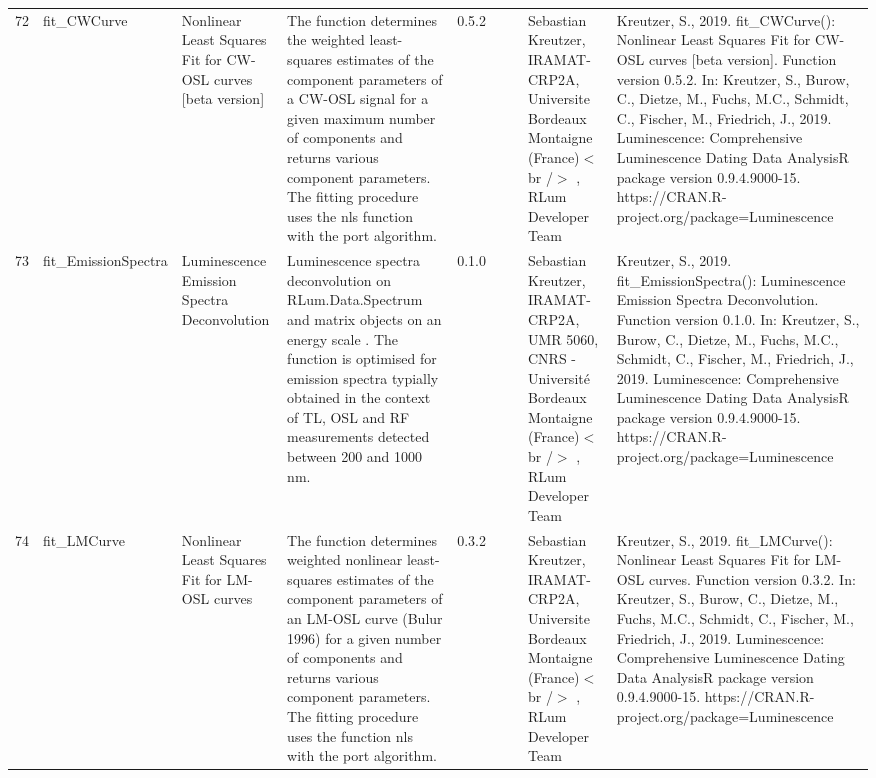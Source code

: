 \begin{table}[ht]
\begin{tabular}{rllllllll}
 \\ 
  72 & fit\_CWCurve & Nonlinear Least Squares Fit for CW-OSL curves  [beta version] & The function determines the weighted least-squares estimates of the component parameters of a CW-OSL signal for a given maximum number of components and returns various component parameters. The fitting procedure uses the  nls  function with the  port  algorithm. & 0.5.2
 &  &  & Sebastian Kreutzer, IRAMAT-CRP2A, Universite Bordeaux Montaigne (France)$<$br /$>$ , RLum Developer Team & Kreutzer, S., 2019. fit\_CWCurve(): Nonlinear Least Squares Fit for CW-OSL curves [beta version]. Function version 0.5.2. In: Kreutzer, S., Burow, C., Dietze, M., Fuchs, M.C., Schmidt, C., Fischer, M., Friedrich, J., 2019. Luminescence: Comprehensive Luminescence Dating Data AnalysisR package version 0.9.4.9000-15. https://CRAN.R-project.org/package=Luminescence
 \\ 
  73 & fit\_EmissionSpectra & Luminescence Emission Spectra Deconvolution & Luminescence spectra deconvolution on  RLum.Data.Spectrum  and  matrix  objects on an  energy scale . The function is optimised for emission spectra typially obtained in the context of TL, OSL and RF measurements detected between 200 and 1000 nm. & 0.1.0
 &  &  & Sebastian Kreutzer, IRAMAT-CRP2A, UMR 5060, CNRS - Université Bordeaux Montaigne (France)$<$br /$>$ , RLum Developer Team & Kreutzer, S., 2019. fit\_EmissionSpectra(): Luminescence Emission Spectra Deconvolution. Function version 0.1.0. In: Kreutzer, S., Burow, C., Dietze, M., Fuchs, M.C., Schmidt, C., Fischer, M., Friedrich, J., 2019. Luminescence: Comprehensive Luminescence Dating Data AnalysisR package version 0.9.4.9000-15. https://CRAN.R-project.org/package=Luminescence
 \\ 
  74 & fit\_LMCurve & Nonlinear Least Squares Fit for LM-OSL curves & The function determines weighted nonlinear least-squares estimates of the component parameters of an LM-OSL curve (Bulur 1996) for a given number of components and returns various component parameters. The fitting procedure uses the function  nls  with the  port  algorithm. & 0.3.2
 &  &  & Sebastian Kreutzer, IRAMAT-CRP2A, Universite Bordeaux Montaigne (France)$<$br /$>$ , RLum Developer Team & Kreutzer, S., 2019. fit\_LMCurve(): Nonlinear Least Squares Fit for LM-OSL curves. Function version 0.3.2. In: Kreutzer, S., Burow, C., Dietze, M., Fuchs, M.C., Schmidt, C., Fischer, M., Friedrich, J., 2019. Luminescence: Comprehensive Luminescence Dating Data AnalysisR package version 0.9.4.9000-15. https://CRAN.R-project.org/package=Luminescence

\end{tabular}
\end{table}
